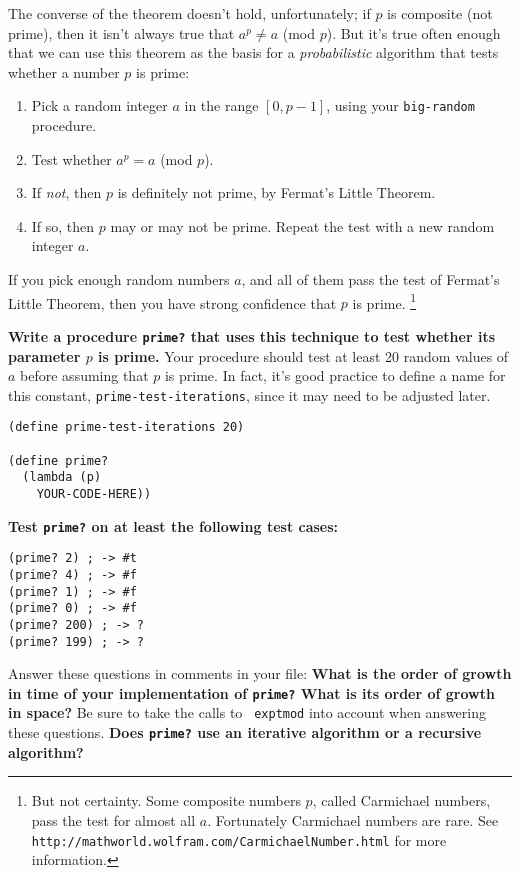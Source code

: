 \newpage

The converse of the theorem doesn't hold, unfortunately; if $p$ is
composite (not prime), then it isn't always true that $a^p \neq a$
(mod $p$).  But it's true often enough that we can use this theorem as
the basis for a {\it probabilistic} algorithm that tests whether a
number $p$ is prime:

\begin{enumerate}
\item Pick a random integer $a$ in the range $[0,p-1]$, using
  your {\tt big-random} procedure.
\item Test whether $a^p = a$ (mod $p$).
\item If {\it not}, then $p$ is definitely not prime, by Fermat's Little Theorem.
\item If so, then $p$ may or may not be prime.  
      Repeat the test with a new random integer $a$.
\end{enumerate}

If you pick enough random numbers $a$, and all of them pass the test
of Fermat's Little Theorem, then you have strong confidence that $p$
is prime.%
\footnote{But not certainty.  Some composite numbers $p$,
  called Carmichael numbers, pass the test for almost all $a$.
  Fortunately Carmichael numbers are rare. 
  See {\tt http://mathworld.wolfram.com/CarmichaelNumber.html}
  for more information.}

{\bf Write a procedure {\tt prime?} that uses this technique
  to test whether its parameter $p$ is prime.}
  Your procedure should test at least 20 random values of $a$
  before assuming that $p$ is prime.  In fact, it's good practice 
  to define a name for this constant, {\tt prime-test-iterations}, 
  since it may need to be adjusted later.

\begin{verbatim}
(define prime-test-iterations 20)

(define prime?
  (lambda (p)
    YOUR-CODE-HERE))
\end{verbatim}

{\bf Test {\tt prime?} on at least the following test cases:}

\begin{verbatim}
(prime? 2) ; -> #t
(prime? 4) ; -> #f
(prime? 1) ; -> #f
(prime? 0) ; -> #f
(prime? 200) ; -> ?
(prime? 199) ; -> ?
\end{verbatim}

Answer these questions in comments in your file: {\bf What is the
  order of growth in time of your implementation of {\tt prime?}  What
  is its order of growth in space?}  Be sure to take the calls to {\tt
  exptmod} into account when answering these questions.  {\bf Does
  {\tt prime?} use an iterative algorithm or a recursive algorithm?}


